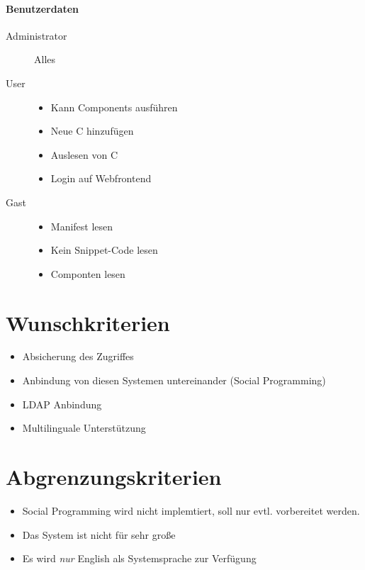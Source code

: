 \paragraph{Benutzerdaten}

\begin{description}
	\item[Administrator] Alles
	\item[User]
		\begin{itemize}
			\item Kann Components ausführen
			\item Neue C hinzufügen
			\item Auslesen von C
			\item Login auf Webfrontend
		\end{itemize}
	\item[Gast] 
		\begin{itemize}
			\item Manifest lesen
			\item Kein Snippet-Code lesen
			\item Componten lesen
		\end{itemize}
\end{description}

\section{Wunschkriterien}

\begin{itemize}
\item  Absicherung des Zugriffes
\item  Anbindung von diesen Systemen untereinander (Social Programming)
\item  LDAP Anbindung
\item  Multilinguale Unterstützung
\end{itemize}

\section{Abgrenzungskriterien}

\begin{itemize}
\item  Social Programming wird nicht implemtiert, soll nur evtl. vorbereitet werden.
\item  Das System ist nicht für sehr große
\item  Es wird \emph{nur} English als Systemsprache zur Verfügung
\end{itemize}
